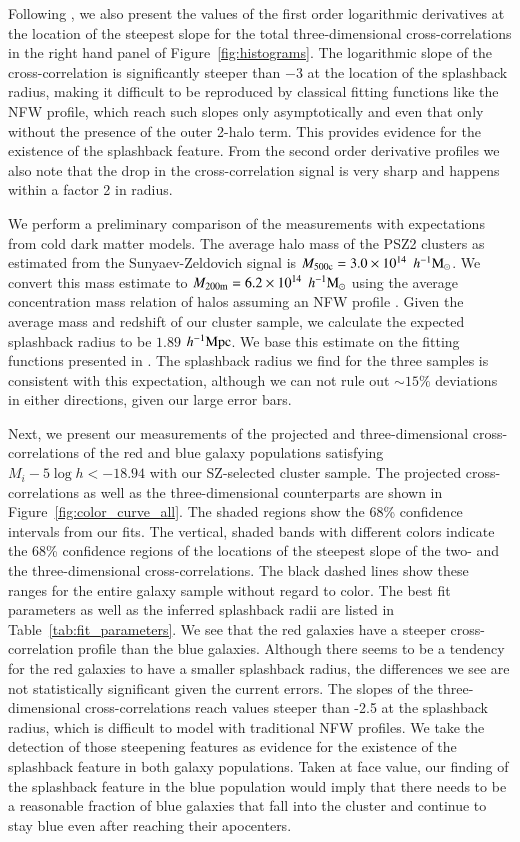 \documentclass[iop, apjl, twocolappendix, numberedappendix]{emulateapj}
\def\mpch{h^{-1}{\rm Mpc}}
\def\msunh{h^{-1}{\rm M_{\odot}}}
\begin{document}
Following \citet{baxter2017halo}, we also present the values of the
first order logarithmic derivatives at the location of the steepest slope for
the total three-dimensional cross-correlations in the right hand panel of
Figure~\ref{fig:histograms}. The logarithmic slope of the
cross-correlation is significantly steeper than $-3$ at the location
of the splashback radius, making it difficult to
be reproduced by classical fitting functions like the NFW profile,
which reach such slopes only asymptotically and even that only
without the presence of the outer 2-halo term. This provides
evidence for the existence of the splashback feature. From the second
order derivative profiles we also note that the drop in the cross-correlation
signal is very sharp and happens within a factor 2 in radius.

We perform a preliminary comparison of the measurements with
expectations from cold dark matter models. The average halo mass of
the PSZ2 clusters as estimated from the Sunyaev-Zeldovich signal
is $M_{\rm 500c}=3.0\times10^{14}$ $\msunh$. We convert this mass
estimate to $M_{\rm 200m}=6.2\times10^{14}$ $\msunh$ using the average
concentration mass relation of halos \citep{Diemer2015} assuming an NFW profile
\citep{HuKravtsov:2003}. Given the average mass and redshift of our
cluster sample, we calculate the expected splashback radius to be
$1.89$ $\mpch$. We base this estimate on the fitting functions
presented in \citet{more2015splashback}. The splashback radius we
find for the three samples is consistent with this expectation,
although we can not rule out $\sim 15\%$ deviations in either directions,
given our large error bars.

Next, we present our measurements of the projected and
three-dimensional cross-correlations of the red and blue galaxy populations
satisfying $M_{i}-5\log h<-18.94$ with our SZ-selected cluster
sample. The projected cross-correlations as well as the three-dimensional
counterparts are shown in Figure~\ref{fig:color_curve_all}. The shaded regions show
the 68\% confidence intervals from our fits. The vertical, shaded
bands with different colors indicate the 68\% confidence regions of
the locations of the steepest slope of the two- and the
three-dimensional cross-correlations. The black dashed lines show
these ranges for the entire galaxy sample without regard to color.
The best fit parameters as well as the inferred splashback radii are
listed in Table~\ref{tab:fit_parameters}. We
see that the red galaxies have a steeper cross-correlation profile
than the blue galaxies. Although there seems to be  a tendency for the red
galaxies to have a smaller splashback radius, the differences we see
are not statistically significant given the current errors. The
slopes of the three-dimensional cross-correlations reach values
steeper than -2.5 at the splashback radius, which is difficult to model with
traditional NFW profiles. We take the detection of those steepening features
as evidence for the existence of the splashback feature in both galaxy populations.
Taken at face value, our finding of the splashback feature in the blue
population would imply that there needs to be a reasonable fraction of
blue galaxies that fall into the cluster and continue to stay blue
even after reaching their apocenters.
\end{document}
